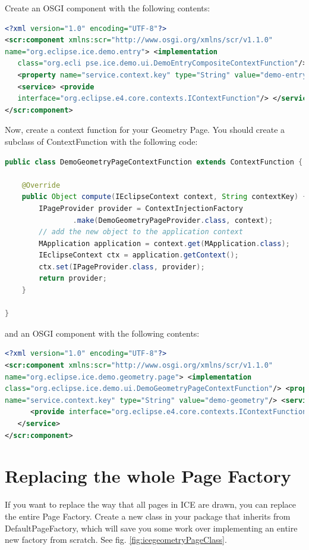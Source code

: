 Create an OSGI component with the following contents:

\begin{lstlisting}[language=xml]
<?xml version="1.0" encoding="UTF-8"?>
<scr:component xmlns:scr="http://www.osgi.org/xmlns/scr/v1.1.0"
name="org.eclipse.ice.demo.entry"> <implementation
   class="org.ecli pse.ice.demo.ui.DemoEntryCompositeContextFunction"/>
   <property name="service.context.key" type="String" value="demo-entry"/>
   <service> <provide
   interface="org.eclipse.e4.core.contexts.IContextFunction"/> </service>
</scr:component>
\end{lstlisting}

Now, create a context function for your Geometry Page. You should create a
subclass of ContextFunction with the following code:

\begin{lstlisting}[language=java]
public class DemoGeometryPageContextFunction extends ContextFunction {

    @Override
    public Object compute(IEclipseContext context, String contextKey) {
        IPageProvider provider = ContextInjectionFactory
                .make(DemoGeometryPageProvider.class, context);
        // add the new object to the application context
        MApplication application = context.get(MApplication.class);
        IEclipseContext ctx = application.getContext();
        ctx.set(IPageProvider.class, provider);
        return provider;
    }

}
\end{lstlisting}

and an OSGI component with the following contents:

\begin{lstlisting}[language=xml]
<?xml version="1.0" encoding="UTF-8"?>
<scr:component xmlns:scr="http://www.osgi.org/xmlns/scr/v1.1.0"
name="org.eclipse.ice.demo.geometry.page"> <implementation
class="org.eclipse.ice.demo.ui.DemoGeometryPageContextFunction"/> <property
name="service.context.key" type="String" value="demo-geometry"/> <service>
      <provide interface="org.eclipse.e4.core.contexts.IContextFunction"/>
   </service>
</scr:component>
\end{lstlisting}

\section{Replacing the whole Page Factory}

If you want to replace the way that all pages in ICE are drawn, you can replace
the entire Page Factory.  Create a new class in your package that inherits from
DefaultPageFactory, which will save you some work over implementing an entire
new factory from scratch. See fig. \ref{fig:icegeometryPageClass}.

